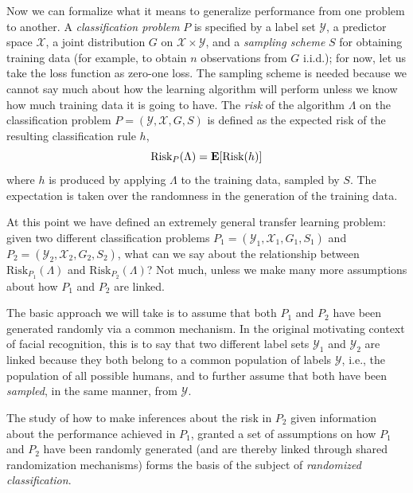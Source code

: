 Now we can formalize what it means to generalize performance from one
problem to another.  A \emph{classification problem} $P$ is specified
by a label set $\mathcal{Y}$, a predictor space $\mathcal{X}$, a joint
distribution $G$ on $\mathcal{X} \times \mathcal{Y}$, and a
\emph{sampling scheme} $S$ for obtaining training data (for example,
to obtain $n$ observations from $G$ i.i.d.); for now, let us take the
loss function as zero-one loss.  The sampling scheme is needed because
we cannot say much about how the learning algorithm will perform
unless we know how much training data it is going to have.  The
\emph{risk} of the algorithm $\Lambda$ on the classification problem
$P = (\mathcal{Y}, \mathcal{X}, G, S)$ is defined as the expected risk
of the resulting classification rule $h$,
\[
\text{Risk}_P(\Lambda) = \textbf{E}[\text{Risk}(h)]
\]
where $h$ is produced by applying $\Lambda$ to the training data,
sampled by $S$.  The expectation is taken over the randomness in the
generation of the training data.

At this point we have defined an extremely general transfer learning
problem: given two different classification problems $P_1 =
(\mathcal{Y}_1, \mathcal{X}_1, G_1, S_1)$ and $P_2 = (\mathcal{Y}_2,
\mathcal{X}_2, G_2, S_2)$, what can we say about the relationship
between $\text{Risk}_{P_1}(\Lambda)$ and $\text{Risk}_{P_2}(\Lambda)$?
Not much, unless we make many more assumptions about how $P_1$ and
$P_2$ are linked.  

The basic approach we will take is to assume that both $P_1$ and $P_2$
have been generated randomly via a common mechanism.  In the original
motivating context of facial recognition, this is to say that two
different label sets $\mathcal{Y}_1$ and $\mathcal{Y}_2$ are linked
because they both belong to a common population of labels
$\mathcal{Y}$, i.e., the population of all possible humans, and to
further assume that both have been \emph{sampled}, in the same manner,
from $\mathcal{Y}$.

The study of how to make inferences about the risk in $P_2$ given
information about the performance achieved in $P_1$, granted a set of
assumptions on how $P_1$ and $P_2$ have been randomly generated (and
are thereby linked through shared randomization mechanisms) forms the
basis of the subject of \emph{randomized classification}.

